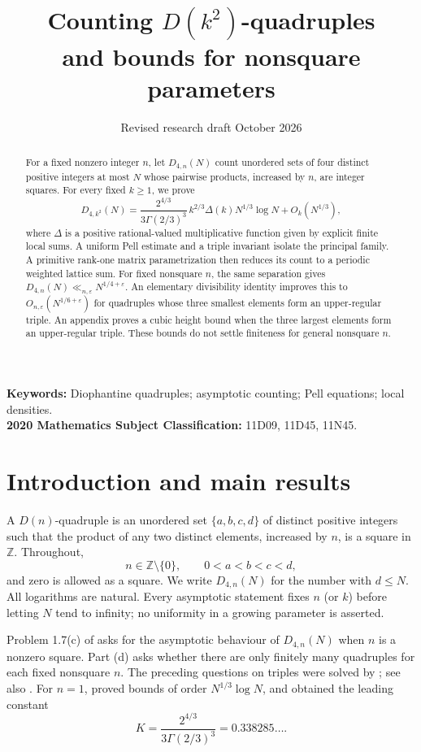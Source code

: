 \documentclass[11pt,a4paper]{article}
\title{Counting $D(k^2)$-quadruples\\and bounds for nonsquare parameters}
\author{}
\date{Revised research draft\quad 14 October 2026}
\numberwithin{equation}{section}
\theoremstyle{remark}
\newcommand{\Z}{\mathbb Z}
\newcommand{\eps}{\varepsilon}
\begin{document}
\maketitle
\begin{abstract}
For a fixed nonzero integer $n$, let $D_{4,n}(N)$ count unordered sets of four distinct positive integers at most $N$ whose pairwise products, increased by $n$, are integer squares. For every fixed $k\ge1$, we prove
\[
D_{4,k^2}(N)=\frac{2^{4/3}}{3\Gamma(2/3)^3}\,k^{2/3}\Delta(k)N^{1/3}\log N
+O_k(N^{1/3}),
\]
where $\Delta$ is a positive rational-valued multiplicative function given by explicit finite local sums. A uniform Pell estimate and a triple invariant isolate the principal family. A primitive rank-one matrix parametrization then reduces its count to a periodic weighted lattice sum. For fixed nonsquare $n$, the same separation gives $D_{4,n}(N)\ll_{n,\eps}N^{1/4+\eps}$. An elementary divisibility identity improves this to $O_{n,\eps}(N^{1/6+\eps})$ for quadruples whose three smallest elements form an upper-regular triple. An appendix proves a cubic height bound when the three largest elements form an upper-regular triple. These bounds do not settle finiteness for general nonsquare $n$.
\end{abstract}
\noindent\textbf{Keywords:} Diophantine quadruples; asymptotic counting; Pell equations; local densities.\\
\textbf{2020 Mathematics Subject Classification:} 11D09, 11D45, 11N45.

\section{Introduction and main results}
A $D(n)$-quadruple is an unordered set $\{a,b,c,d\}$ of distinct positive integers such that the product of any two distinct elements, increased by $n$, is a square in $\Z$. Throughout,
\[
n\in\Z\setminus\{0\},\qquad 0<a<b<c<d,
\]
and zero is allowed as a square. We write $D_{4,n}(N)$ for the number with $d\le N$. All logarithms are natural. Every asymptotic statement fixes $n$ (or $k$) before letting $N$ tend to infinity; no uniformity in a growing parameter is asserted.

Problem 1.7(c) of \citet{DujellaList} asks for the asymptotic behaviour of $D_{4,n}(N)$ when $n$ is a nonzero square. Part (d) asks whether there are only finitely many quadruples for each fixed nonsquare $n$. The preceding questions on triples were solved by \citet{Badesa}; see also \citet{DKM}. For $n=1$, \citet{Dujella2008} proved bounds of order $N^{1/3}\log N$, and \citet{MartinSitar} obtained the leading constant
\begin{equation}\label{eq:K}
K=\frac{2^{4/3}}{3\Gamma(2/3)^3}=0.338285\ldots.
\end{equation}
\end{document}
